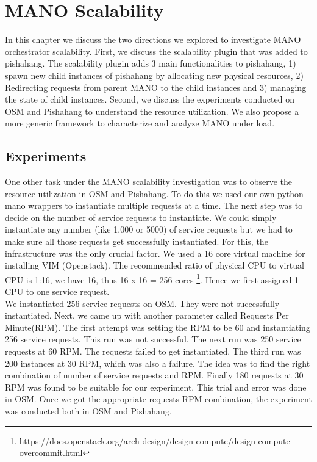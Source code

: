 \chapter{MANO Scalability}
\label{ch:Scalability}

In this chapter we discuss the two directions we explored to investigate MANO orchestrator scalability. First, we discuss the scalability plugin that was added to pishahang. The scalability plugin adds 3 main functionalities to pishahang, 1) spawn new child instances of pishahang by allocating new physical resources, 2) Redirecting requests from parent MANO to the child instances and 3) managing the state of child instances. Second, we discuss the experiments conducted on OSM and Pishahang to understand the resource utilization. We also propose a more generic framework to characterize and analyze MANO under load.





\section{Experiments}
One other task under the MANO scalability investigation was to observe the resource utilization in OSM and Pishahang. To do this we used our own python-mano wrappers to instantiate multiple requests at a time. The next step was to decide on the number of service requests to instantiate. We could simply instantiate any number (like 1,000 or 5000) of service requests but we had to make sure all those requests get successfully instantiated. For this, the infrastructure was the only crucial factor. We used a 16 core virtual machine for installing VIM (Openstack). The recommended ratio of physical CPU to virtual CPU is 1:16, we have 16, thus 16 x 16 = 256 cores \footnote{https://docs.openstack.org/arch-design/design-compute/design-compute-overcommit.html}. Hence we first assigned 1 CPU to one service request.\\

We instantiated 256 service requests on OSM. They were not successfully instantiated. Next, we came up with another parameter called Requests Per Minute(RPM). The first attempt was setting the RPM to be 60 and instantiating 256 service requests. This run was not successful. The next run was 250 service requests at 60 RPM. The requests failed to get instantiated. The third run was 200 instances at 30 RPM, which was also a failure. The idea was to find the right combination of number of service requests and RPM. Finally 180 requests at 30 RPM was found to be suitable for our experiment. This trial and error was done in OSM. Once we got the appropriate requests-RPM combination, the experiment was conducted both in OSM and Pishahang.\\

